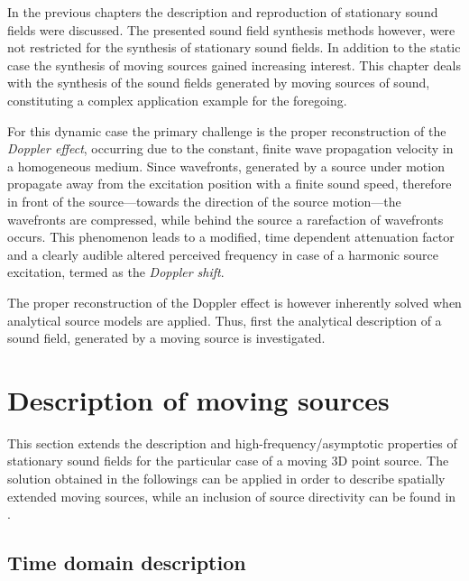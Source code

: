 In the previous chapters the description and reproduction of stationary sound fields were discussed.
The presented sound field synthesis methods however, were not restricted for the synthesis of stationary sound fields.
In addition to the static case the synthesis of moving sources gained increasing interest.
This chapter deals with the synthesis of the sound fields generated by moving sources of sound, constituting a complex application example for the foregoing.

For this dynamic case the primary challenge is the proper reconstruction of the \emph{Doppler effect}, occurring due to the constant, finite wave propagation velocity in a homogeneous medium.
Since wavefronts, generated by a source under motion propagate away from the excitation position with a finite sound speed, therefore in front of the source---towards the direction of the source motion---the wavefronts are compressed, while behind the source a rarefaction of wavefronts occurs.
This phenomenon leads to a modified, time dependent attenuation factor and a clearly audible altered perceived frequency in case of a harmonic source excitation, termed as the \emph{Doppler shift}.

The proper reconstruction of the Doppler effect is however inherently solved when analytical source models are applied.
Thus, first the analytical description of a sound field, generated by a moving source is investigated.

\section{Description of moving sources}

This section extends the description and high-frequency/asymptotic properties of stationary sound fields for the particular case of a moving 3D point source.
The solution obtained in the followings can be applied in order to describe spatially extended moving sources, while an inclusion of source directivity can be found in \cite{Warren1976, Ahrens2011_moving_source_WFS}.

\subsection{Time domain description}
	
